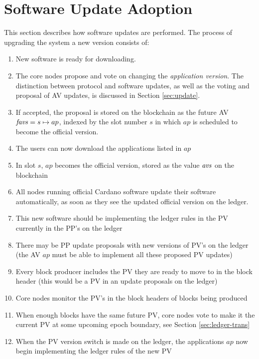 \section{Software Update Adoption}
\label{sec:software-updates}

This section describes how software updates are performed.
The process of upgrading the system a new version consists of:

\begin{enumerate}
  \item New software is ready for downloading.
  \item The core nodes propose and vote on changing the
    \textit{application version}.
    The distinction between protocol and software updates, as well
    as the voting and proposal of AV updates, is discussed
    in Section \ref{sec:update}.
  \item If accepted, the proposal is stored on the blockchain as the future AV
    $\mathit{favs} = s \mapsto ap$,
    indexed by the slot number $s$ in which $ap$
    is scheduled to become the official version.
  \item The users can now download the applications listed in $ap$
  \item In slot $s$, $ap$ becomes the official version, stored as the value
  $\mathit{avs}$ on the blockchain
  \item All nodes running official Cardano software update their software
  automatically, as soon as they see the updated official version on the ledger.
  \item This new software should be implementing the ledger rules in the
  PV currently in the PP's on the ledger
  \item There may be PP update proposals with new versions of PV's on the ledger
  (the AV $ap$ must be able to implement all these proposed PV updates)
  \item Every block producer includes the PV they are ready to move to
  in the block header (this would be a PV in an update proposals on the ledger)
  \item Core nodes monitor the PV's in the block headers of blocks being produced
  \item When enough blocks have the same future PV, core nodes vote to make
  it the current PV at some upcoming epoch boundary, see Section \ref{sec:ledger-trans}
  \item When the PV version switch is made on the ledger, the applications $ap$
  now begin implementing the ledger rules of the new PV
\end{enumerate}
